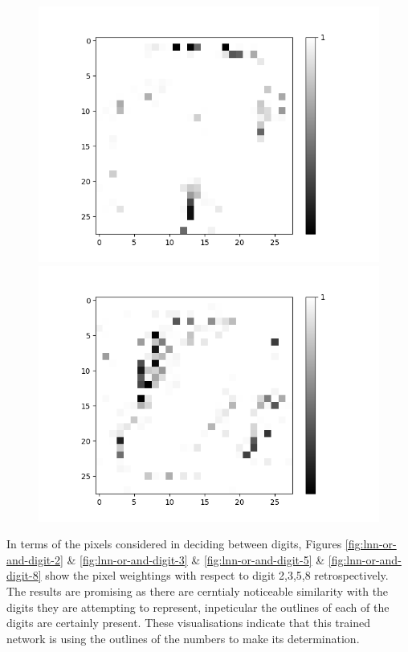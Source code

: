 \begin{figure}[H]
\begin{minipage}[b]{0.45\textwidth}
		\caption{}
		\label{fig:lnn-or-and-neuron-9}
	\end{minipage}
	\begin{minipage}[b]{0.45\textwidth}
		\includegraphics[width=\textwidth]{LNN-OR-AND/Neuron-13.png}
		\caption{}
		\label{fig:lnn-or-and-neuron-13}
	\end{minipage}
	\begin{minipage}[b]{0.45\textwidth}
		\includegraphics[width=\textwidth]{LNN-OR-AND/Neuron-28.png}
		\caption{}
		\label{fig:lnn-or-and-neuron-28}
	\end{minipage}
	\hfill
\end{figure}

In terms of the pixels considered in deciding between digits, Figures \ref{fig:lnn-or-and-digit-2} \& \ref{fig:lnn-or-and-digit-3} \& \ref{fig:lnn-or-and-digit-5} \& \ref{fig:lnn-or-and-digit-8} show the pixel weightings with respect to digit 2,3,5,8 retrospectively. The results are promising as there are cerntialy noticeable similarity with the digits they are attempting to represent, inpeticular the outlines of each of the digits are certainly present. These visualisations indicate that this trained network is using the outlines of the numbers to make its determination.

